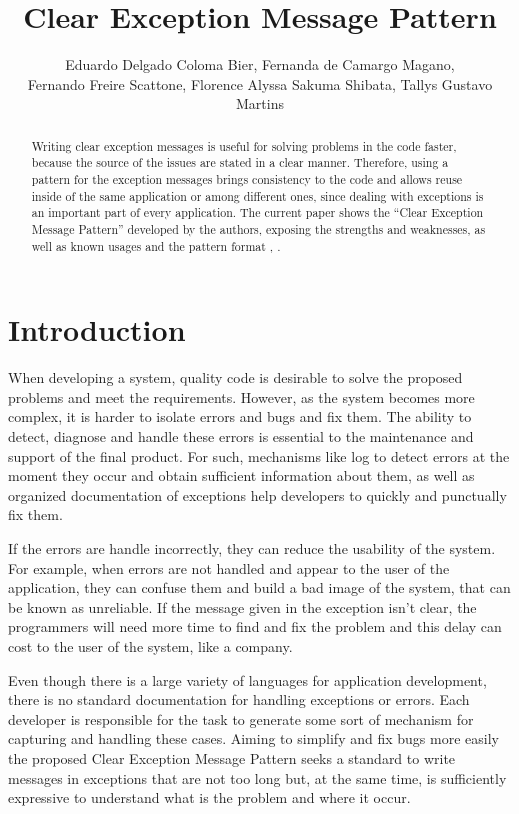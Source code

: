 \documentclass[12pt]{article}
\title{Clear Exception Message Pattern}
\author{Eduardo Delgado Coloma Bier\inst{1}, Fernanda de Camargo Magano\inst{1}, \\ Fernando Freire Scattone\inst{1},
  Florence Alyssa Sakuma Shibata\inst{1}, Tallys Gustavo Martins\inst{1} }
\begin{document}
 

\maketitle

\begin{abstract}

Writing clear exception messages is useful for solving problems in the code faster, because the source of the issues are stated in a clear manner. Therefore, using a pattern for the exception messages brings consistency to the code and allows reuse inside of the same application or among different ones, since dealing with exceptions is an important part of every application. The current paper shows the ``Clear Exception Message Pattern''     developed by the authors, exposing the strengths and weaknesses, as well as known usages and the pattern format \cite{smith:99}, \cite{bernardo2008importancia}. 
  
\end{abstract}


\section{Introduction}

When developing a system, quality code is desirable to solve the proposed problems and meet the requirements. However, as the system becomes more complex, it is harder to isolate errors and bugs and fix them. The ability to detect, diagnose and handle these errors is essential to the maintenance and support of the final product. For such, mechanisms like log to detect errors at the moment they occur and obtain sufficient information about them, as well as  organized documentation of exceptions help developers to quickly and punctually fix them.

If the errors are handle incorrectly, they can reduce the usability of the system. For example, when errors are not handled and appear to the user of the application, they can confuse them and build a bad image of the system, that can be known as unreliable. If the message given in the exception isn't clear, the programmers will need more time to find and fix the problem and this delay can cost to the user of the system, like a company.

Even though there is a large variety of languages for application development, there is no standard documentation for handling exceptions or errors. Each developer is responsible for the task to generate some sort of mechanism for capturing and handling these cases. Aiming to simplify and fix bugs more easily the proposed Clear Exception Message Pattern seeks a standard to write messages in exceptions that are not too long but, at the same time, is sufficiently expressive  to understand what is the problem and where it occur.
\end{document}
